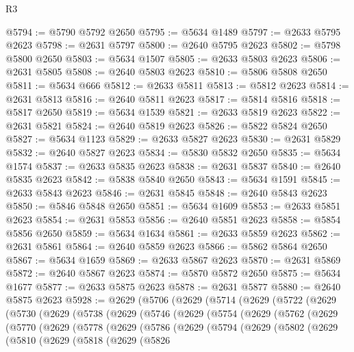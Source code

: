 \begin{lexlean}{R3}
\begin{coremodule}
@5794 := @5790 @5792 @2650
@5795 := @5634 @1489
@5797 := @2633 @5795 @2623
@5798 := @2631 @5797
@5800 := @2640 @5795 @2623
@5802 := @5798 @5800 @2650
@5803 := @5634 @1507
@5805 := @2633 @5803 @2623
@5806 := @2631 @5805
@5808 := @2640 @5803 @2623
@5810 := @5806 @5808 @2650
@5811 := @5634 @666
@5812 := @2633 @5811
@5813 := @5812 @2623
@5814 := @2631 @5813
@5816 := @2640 @5811 @2623
@5817 := @5814 @5816
@5818 := @5817 @2650
@5819 := @5634 @1539
@5821 := @2633 @5819 @2623
@5822 := @2631 @5821
@5824 := @2640 @5819 @2623
@5826 := @5822 @5824 @2650
@5827 := @5634 @1123
@5829 := @2633 @5827 @2623
@5830 := @2631 @5829
@5832 := @2640 @5827 @2623
@5834 := @5830 @5832 @2650
@5835 := @5634 @1574
@5837 := @2633 @5835 @2623
@5838 := @2631 @5837
@5840 := @2640 @5835 @2623
@5842 := @5838 @5840 @2650
@5843 := @5634 @1591
@5845 := @2633 @5843 @2623
@5846 := @2631 @5845
@5848 := @2640 @5843 @2623
@5850 := @5846 @5848 @2650
@5851 := @5634 @1609
@5853 := @2633 @5851 @2623
@5854 := @2631 @5853
@5856 := @2640 @5851 @2623
@5858 := @5854 @5856 @2650
@5859 := @5634 @1634
@5861 := @2633 @5859 @2623
@5862 := @2631 @5861
@5864 := @2640 @5859 @2623
@5866 := @5862 @5864 @2650
@5867 := @5634 @1659
@5869 := @2633 @5867 @2623
@5870 := @2631 @5869
@5872 := @2640 @5867 @2623
@5874 := @5870 @5872 @2650
@5875 := @5634 @1677
@5877 := @2633 @5875 @2623
@5878 := @2631 @5877
@5880 := @2640 @5875 @2623
@5928 := @2629
    (@5706
      (@2629
        (@5714
          (@2629
            (@5722
              (@2629
                (@5730
                  (@2629
                    (@5738
                      (@2629
                        (@5746
                          (@2629
                            (@5754
                              (@2629
                                (@5762
                                  (@2629
                                    (@5770
                                      (@2629
                                        (@5778
                                          (@2629
                                            (@5786
                                              (@2629
                                                (@5794
                                                  (@2629
                                                    (@5802
                                                      (@2629
                                                        (@5810
                                                          (@2629
                                                            (@5818
                                                              (@2629
                                                                (@5826

\end{coremodule}
\end{lexlean}
